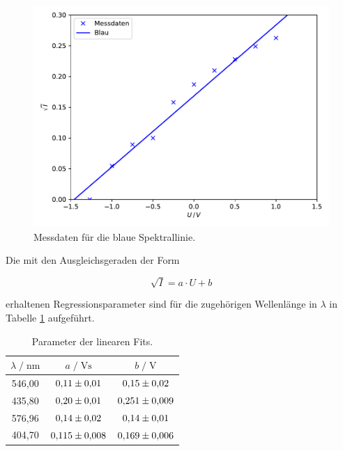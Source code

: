 \begin{figure}
  \centering
  \includegraphics[scale=0.4]{content/plot4.pdf}
  \caption{Messdaten für die blaue Spektrallinie.}
  \label{fig:plot4}
\end{figure}

Die mit den Ausgleichsgeraden der Form 

\begin{equation*}
\sqrt{I} = a\cdot U + b 
\end{equation*}

erhaltenen Regressionsparameter sind für die zugehörigen Wellenlänge in $\lambda$ in Tabelle \ref{tab:para} aufgeführt. 

\begin{table}
    \centering
    \caption{Parameter der linearen Fits.}
    \label{tab:para}
    \begin{tabular}{c c c}
    \toprule
    $ \lambda \;/\; \si{\nano\meter} $ & $a \;/\; \si{\volt\second}$ &
    $ b \;/\; \si{\volt}$\\
    \midrule 
      546,00 & $\num{0.11+-0.01}$ & $\num{0.15+-0.02}$\\ %
      435,80 & $\num{0.20+-0.01}$ & $\num{0.251+-0.009}$\\ %
      576,96 & $\num{0.14+-0.02}$ & $\num{0.14+-0.01}$\\ %
      404,70 & $\num{0.115+-0.008}$ & $\num{0.169+-0.006}$\\ %
    \bottomrule
    \end{tabular}
\end{table}

